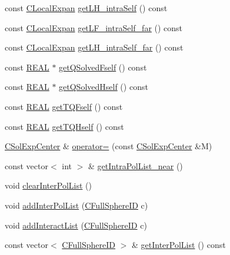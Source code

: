 \begin{DoxyCompactItemize}
\item 
const \hyperlink{classCLocalExpan}{C\-Local\-Expan} \hyperlink{classCSolExpCenter_ae921d87a7c2f4eca4824c8f93e42433f}{get\-L\-H\-\_\-intra\-Self} () const 
\item 
const \hyperlink{classCLocalExpan}{C\-Local\-Expan} \hyperlink{classCSolExpCenter_a8c882bfb08c917b30cbad7c8e93f6bc7}{get\-L\-F\-\_\-intra\-Self\-\_\-far} () const 
\item 
const \hyperlink{classCLocalExpan}{C\-Local\-Expan} \hyperlink{classCSolExpCenter_aaf0a37d3c4635d9ba59f1965bcafd630}{get\-L\-H\-\_\-intra\-Self\-\_\-far} () const 
\item 
const \hyperlink{util_8h_a5821460e95a0800cf9f24c38915cbbde}{R\-E\-A\-L} $\ast$ \hyperlink{classCSolExpCenter_a248b6ec1d34cde98706238b8db8a03f4}{get\-Q\-Solved\-Fself} () const 
\item 
const \hyperlink{util_8h_a5821460e95a0800cf9f24c38915cbbde}{R\-E\-A\-L} $\ast$ \hyperlink{classCSolExpCenter_a8581cced17fcfc4afa7de4700870ef00}{get\-Q\-Solved\-Hself} () const 
\item 
const \hyperlink{util_8h_a5821460e95a0800cf9f24c38915cbbde}{R\-E\-A\-L} \hyperlink{classCSolExpCenter_adc5fc659d11a5d6a9a8305bec32e27ee}{get\-T\-Q\-Fself} () const 
\item 
const \hyperlink{util_8h_a5821460e95a0800cf9f24c38915cbbde}{R\-E\-A\-L} \hyperlink{classCSolExpCenter_a080880ed3843b820b9ed5bc6e12aa845}{get\-T\-Q\-Hself} () const 
\item 
\hyperlink{classCSolExpCenter}{C\-Sol\-Exp\-Center} \& \hyperlink{classCSolExpCenter_af3962206578a813ccea23baadb8b275d}{operator=} (const \hyperlink{classCSolExpCenter}{C\-Sol\-Exp\-Center} \&M)
\item 
const vector$<$ int $>$ \& \hyperlink{classCSolExpCenter_ae5d390d58340cf2a325e1af732749466}{get\-Intra\-Pol\-List\-\_\-near} ()
\item 
void \hyperlink{classCSolExpCenter_aa62fb8836a8a69f82366c69a21475d7b}{clear\-Inter\-Pol\-List} ()
\item 
void \hyperlink{classCSolExpCenter_a006b9bfbbd2cb92d66a22140a2a7db74}{add\-Inter\-Pol\-List} (\hyperlink{classCFullSphereID}{C\-Full\-Sphere\-I\-D} c)
\item 
void \hyperlink{classCSolExpCenter_ab507301f7d39d5a8d591b5f77b2476fc}{add\-Interact\-List} (\hyperlink{classCFullSphereID}{C\-Full\-Sphere\-I\-D} c)
\item 
const vector$<$ \hyperlink{classCFullSphereID}{C\-Full\-Sphere\-I\-D} $>$ \& \hyperlink{classCSolExpCenter_a61a341e0ae9325bf33e27aed01dd748c}{get\-Inter\-Pol\-List} () const 

\end{DoxyCompactItemize}
